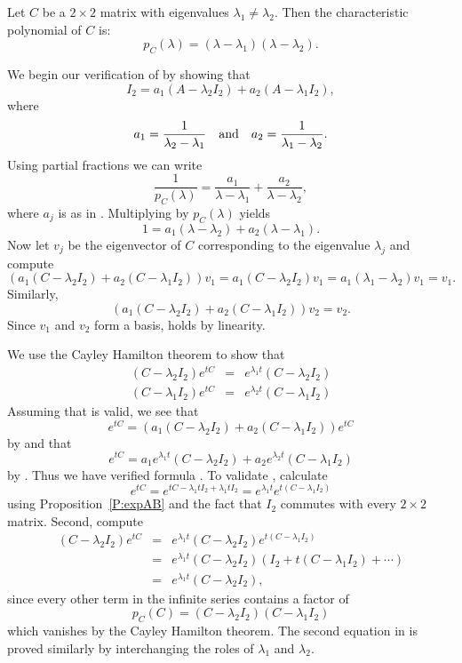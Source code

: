 \documentclass{ximera}
\begin{document}
Let $C$ be a $2\times 2$ matrix with eigenvalues $\lambda_1\neq\lambda_2$.
Then the characteristic polynomial of $C$ is:
\[
p_C(\lambda) = (\lambda-\lambda_1)(\lambda-\lambda_2).
\]

We begin our verification of  by showing that
\begin{equation}  \label{E:Inpart}
I_2 = a_1 (A - \lambda_2I_2) + a_2 (A - \lambda_1I_2),
\end{equation}
where
\begin{equation}  \label{E:pfcoeff}
a_1 = \frac{1}{\lambda_2-\lambda_1} \quad\mbox{and}\quad a_2 = \frac{1}{\lambda_1-\lambda_2}.
\end{equation}
Using partial fractions we can write
\begin{equation}  \label{E:partfrac}
\frac{1}{p_C(\lambda)} = \frac{a_1}{\lambda-\lambda_1} +
\frac{a_2}{\lambda-\lambda_2},
\end{equation}
where $a_j$ is as in .
Multiplying  by $p_C(\lambda)$ yields
\[
1 = a_1 (\lambda-\lambda_2) + a_2 (\lambda-\lambda_1).
\]
Now let $v_j$ be the eigenvector of $C$ corresponding to the eigenvalue
$\lambda_j$ and compute
\[
(a_1 (C - \lambda_2I_2) + a_2 (C - \lambda_1I_2))v_1 =
a_1(C - \lambda_2I_2)v_1 = a_1(\lambda_1-\lambda_2)v_1 = v_1.
\]
Similarly,
\[
(a_1 (C - \lambda_2I_2) + a_2 (C - \lambda_1I_2))v_2 = v_2.
\]
Since $v_1$ and $v_2$ form a basis,  holds by linearity.

We use the Cayley Hamilton theorem to show that
\begin{equation}  \label{E:almost}
\begin{array}{rcl}
(C - \lambda_2I_2)e^{tC} & = & e^{\lambda_1 t}(C - \lambda_2I_2)\\
(C - \lambda_1I_2)e^{tC} & = & e^{\lambda_2 t}(C - \lambda_1I_2)
\end{array}
\end{equation}
Assuming that  is valid, we see that
\[
e^{tC} = (a_1 (C - \lambda_2I_2) + a_2 (C - \lambda_1I_2))e^{tC}
\]
by  and that
\[
e^{tC} = a_1 e^{\lambda_1 t}(C - \lambda_2I_2) +
a_2 e^{\lambda_2 t}(C - \lambda_1I_2)
\]
by .  Thus we have verified formula .
To validate , calculate
\[
e^{tC} = e^{tC - \lambda_1 tI_2 + \lambda_1 tI_2} =
e^{\lambda_1t}e^{t(C - \lambda_1 I_2)}
\]
using Proposition~\ref{P:expAB} and the fact that $I_2$ commutes with every
$2\times 2$ matrix.  Second, compute
\begin{eqnarray*}
(C - \lambda_2I_2)e^{tC} & = &
e^{\lambda_1 t}(C - \lambda_2I_2)e^{t(C - \lambda_1 I_2)} \\
& = &  e^{\lambda_1 t}(C - \lambda_2I_2)(I_2 + t(C - \lambda_1 I_2) + \cdots)\\
& = & e^{\lambda_1 t}(C - \lambda_2I_2),
\end{eqnarray*}
since every other term in the infinite series contains a factor of
\[
p_C(C) = (C - \lambda_2I_2)(C - \lambda_1 I_2)
\]
which vanishes by the Cayley Hamilton theorem.  The second equation in
 is proved similarly by interchanging the roles of $\lambda_1$
and $\lambda_2$.
\end{document}
